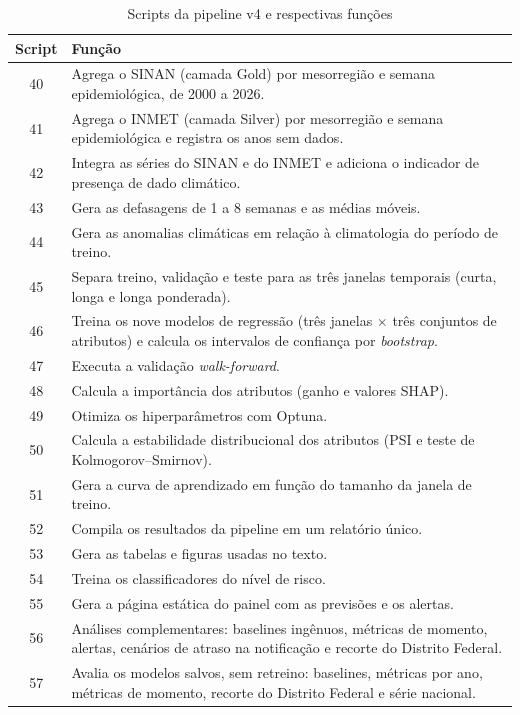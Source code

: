 \begin{apendicesenv}
\begin{table}[htbp]
\centering
\caption{Scripts da pipeline v4 e respectivas funções}
\label{tab:scripts}
\footnotesize
\begin{tabular}{|c|p{}|}
\hline
\textbf{Script} & \textbf{Função} \\ \hline
40 & Agrega o SINAN (camada Gold) por mesorregião e semana epidemiológica, de 2000 a 2026. \\ \hline
41 & Agrega o INMET (camada Silver) por mesorregião e semana epidemiológica e registra os anos sem dados. \\ \hline
42 & Integra as séries do SINAN e do INMET e adiciona o indicador de presença de dado climático. \\ \hline
43 & Gera as defasagens de 1 a 8 semanas e as médias móveis. \\ \hline
44 & Gera as anomalias climáticas em relação à climatologia do período de treino. \\ \hline
45 & Separa treino, validação e teste para as três janelas temporais (curta, longa e longa ponderada). \\ \hline
46 & Treina os nove modelos de regressão (três janelas $\times$ três conjuntos de atributos) e calcula os intervalos de confiança por \textit{bootstrap}. \\ \hline
47 & Executa a validação \textit{walk-forward}. \\ \hline
48 & Calcula a importância dos atributos (ganho e valores SHAP). \\ \hline
49 & Otimiza os hiperparâmetros com Optuna. \\ \hline
50 & Calcula a estabilidade distribucional dos atributos (PSI e teste de Kolmogorov--Smirnov). \\ \hline
51 & Gera a curva de aprendizado em função do tamanho da janela de treino. \\ \hline
52 & Compila os resultados da pipeline em um relatório único. \\ \hline
53 & Gera as tabelas e figuras usadas no texto. \\ \hline
54 & Treina os classificadores do nível de risco. \\ \hline
55 & Gera a página estática do painel com as previsões e os alertas. \\ \hline
56 & Análises complementares: baselines ingênuos, métricas de momento, alertas, cenários de atraso na notificação e recorte do Distrito Federal. \\ \hline
57 & Avalia os modelos salvos, sem retreino: baselines, métricas por ano, métricas de momento, recorte do Distrito Federal e série nacional. \\ \hline

\end{tabular}
\end{table}
\end{apendicesenv}
